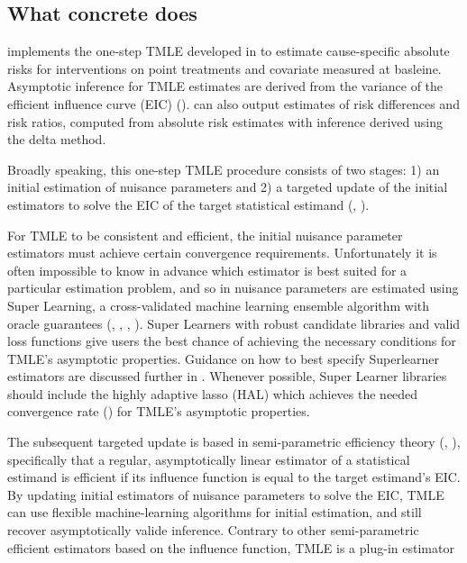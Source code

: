 \documentclass{report}
\newcommand{\1}{\ensuremath{\mathbf{1}}}
\begin{document}
\subsection{What concrete does}
\label{sec:org89ec992}
 implements the one-step TMLE developed in \cite{rytgaard_one-step_2021} to estimate cause-specific absolute risks for interventions on point treatments and covariate measured at basleine. Asymptotic inference for TMLE estimates are derived from the variance of the efficient influence curve (EIC) (\cite{laan_unified_2003-1}).  can also output estimates of risk differences and risk ratios, computed from absolute risk estimates with inference derived using the delta method.

Broadly speaking, this one-step TMLE procedure consists of two stages: 1) an initial estimation of nuisance parameters and 2) a targeted update of the initial estimators to solve the EIC of the target statistical estimand (\cite{laan_unified_2003-1}, \cite{kennedy_semiparametric_2016}).

For TMLE to be consistent and efficient, the initial nuisance parameter estimators must achieve certain convergence requirements. Unfortunately it is often impossible to know in advance which estimator is best suited for a particular estimation problem, and so in  nuisance parameters are estimated using Super Learning, a cross-validated machine learning ensemble algorithm with oracle guarantees (\cite{laan_super_2007}, \cite{polley_superlearner_2021}, \cite{laan_unified_2003}, \cite{vaart_oracle_2006}). Super Learners with robust candidate libraries and valid loss functions give users the best chance of achieving the necessary conditions for TMLE's asymptotic properties. Guidance on how to best specify Superlearner estimators are discussed further in \cite{phillips_practical_2022}. Whenever possible, Super Learner libraries should include the highly adaptive lasso (HAL) which achieves the needed convergence rate (\cite{laan_generally_2017,benkeser_highly_2016,rytgaard_continuous-time_2021}) for TMLE's asymptotic properties.

The subsequent targeted update is based in semi-parametric efficiency theory (\cite{laan_targeted_2011}, \cite{kennedy_semiparametric_2016}), specifically that a regular, asymptotically linear estimator of a statistical estimand is efficient if its influence function is equal to the target estimand's EIC. By updating initial estimators of nuisance parameters to solve the EIC, TMLE can use flexible machine-learning algorithms for initial estimation, and still recover asymptotically valide inference. Contrary to other semi-parametric efficient estimators based on the influence function, TMLE is a plug-in estimator 
\end{document}
